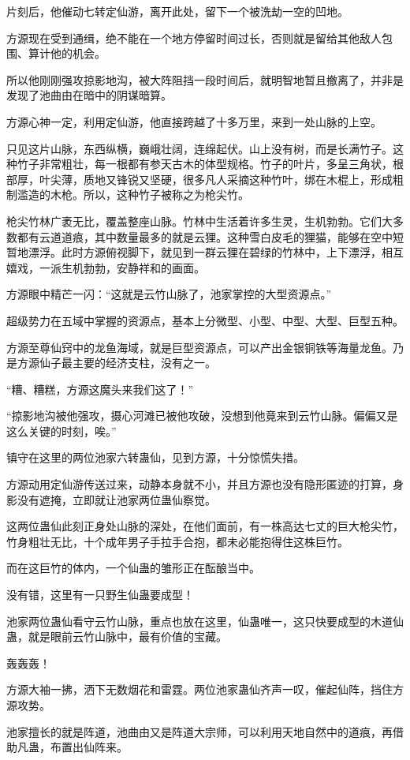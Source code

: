 \begin{this_body}
片刻后，他催动七转定仙游，离开此处，留下一个被洗劫一空的凹地。

方源现在受到通缉，绝不能在一个地方停留时间过长，否则就是留给其他敌人包围、算计他的机会。

所以他刚刚强攻掠影地沟，被大阵阻挡一段时间后，就明智地暂且撤离了，并非是发现了池曲由在暗中的阴谋暗算。

方源心神一定，利用定仙游，他直接跨越了十多万里，来到一处山脉的上空。

只见这片山脉，东西纵横，巍峨壮阔，连绵起伏。山上没有树，而是长满竹子。这种竹子非常粗壮，每一根都有参天古木的体型规格。竹子的叶片，多呈三角状，根部厚，叶尖薄，质地又锋锐又坚硬，很多凡人采摘这种竹叶，绑在木棍上，形成粗制滥造的木枪。所以，这种竹子被称之为枪尖竹。

枪尖竹林广袤无比，覆盖整座山脉。竹林中生活着许多生灵，生机勃勃。它们大多数都有云道道痕，其中数量最多的就是云狸。这种雪白皮毛的狸猫，能够在空中短暂地漂浮。此时方源俯视脚下，就见到一群云狸在碧绿的竹林中，上下漂浮，相互嬉戏，一派生机勃勃，安静祥和的画面。

方源眼中精芒一闪：“这就是云竹山脉了，池家掌控的大型资源点。”

超级势力在五域中掌握的资源点，基本上分微型、小型、中型、大型、巨型五种。

方源至尊仙窍中的龙鱼海域，就是巨型资源点，可以产出金银铜铁等海量龙鱼。乃是方源仙子最主要的经济支柱，没有之一。

“糟、糟糕，方源这魔头来我们这了！”

“掠影地沟被他强攻，摄心河滩已被他攻破，没想到他竟来到云竹山脉。偏偏又是这么关键的时刻，唉。”

镇守在这里的两位池家六转蛊仙，见到方源，十分惊慌失措。

方源动用定仙游传送过来，动静本身就不小，并且方源也没有隐形匿迹的打算，身影没有遮掩，立即就让池家两位蛊仙察觉。

这两位蛊仙此刻正身处山脉的深处，在他们面前，有一株高达七丈的巨大枪尖竹，竹身粗壮无比，十个成年男子手拉手合抱，都未必能抱得住这株巨竹。

而在这巨竹的体内，一个仙蛊的雏形正在酝酿当中。

没有错，这里有一只野生仙蛊要成型！

池家两位蛊仙看守云竹山脉，重点也放在这里，仙蛊唯一，这只快要成型的木道仙蛊，就是眼前云竹山脉中，最有价值的宝藏。

轰轰轰！

方源大袖一拂，洒下无数烟花和雷霆。两位池家蛊仙齐声一叹，催起仙阵，挡住方源攻势。

池家擅长的就是阵道，池曲由又是阵道大宗师，可以利用天地自然中的道痕，再借助凡蛊，布置出仙阵来。


\end{this_body}
